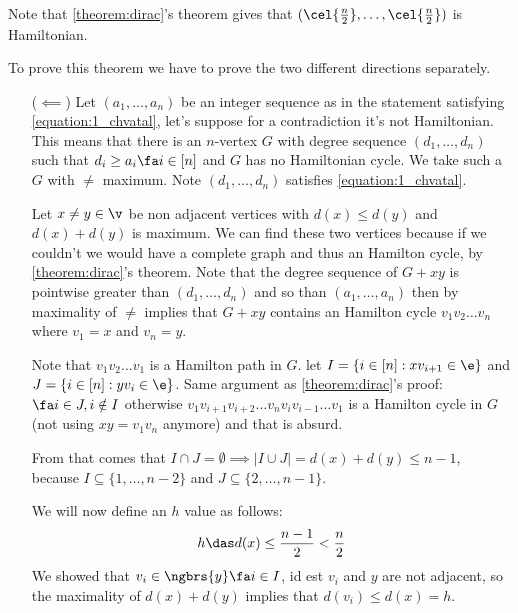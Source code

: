 Note that \ref{theorem:dirac}'s theorem gives that $(\cel{\frac{n}{2}}, \dots, \cel{\frac{n}{2}})$ is Hamiltonian.
\begin{prf}
    To prove this theorem we have to prove the two different directions separately.
    \begin{itemize}
        \item[($\impliedby$)] Let $(a_1, \dots, a_n)$ be an integer sequence as in the statement satisfying \ref{equation:1_chvatal}, let's suppose for a contradiction it's not Hamiltonian. This means that there is an $n$-vertex $G$ with degree sequence $(d_1, \dots, d_n)$ such that $d_i \geq a_i \fa i \in [n]$ and $G$ has no Hamiltonian cycle. We take such a $G$ with $\ne$ maximum. Note $(d_1, \dots, d_n)$ satisfies \ref{equation:1_chvatal}.
        
        Let $x \neq y \in \v$ be non adjacent vertices with $d(x) \leq d(y)$ and $d(x) + d(y)$ is maximum. We can find these two vertices because if we couldn't we would have a complete graph and thus an Hamilton cycle, by \ref{theorem:dirac}'s theorem. Note that the degree sequence of $G + xy$ is pointwise greater than $(d_1, \dots, d_n)$ and so than $(a_1, \dots, a_n)$ then by maximality of $\ne$ implies that $G + xy$ contains an Hamilton cycle $v_1v_2 \dots v_n$ where $v_1 = x$ and $v_n = y$.

        Note that $v_1v_2 \dots v_1$  is a Hamilton path in $G$. let $I = \{i \in [n]: xv_{i + 1} \in \e\}$ and $J = \{i \in [n]: yv_i \in \e\}$. Same argument as \ref{theorem:dirac}'s proof: $\fa i \in J, i \notin I$ otherwise $v_1 v_{i + 1} v_{i + 2} \dots v_n v_i v_{i - 1} \dots v_1$ is a Hamilton cycle in $G$ (not using $xy = v_1v_n$ anymore) and that is absurd.

        From that comes that $I \cap J = \emptyset \implies |I \cup J| = d(x) + d(y) \leq n - 1$, because $I \subseteq \{1, \dots, n - 2\}$ and $J \subseteq \{2, \dots, n - 1\}$.

        We will now define an $h$ value as follows:
        \begin{equation*}
            h \das d(x) \leq \frac{n - 1}{2} < \frac{n}{2}
        \end{equation*}
        We showed that $v_i \in \ngbrs{y} \fa i \in I$, id est $v_i$ and $y$ are not adjacent, so the maximality of $d(x) + d(y)$ implies that $d(v_i) \leq d(x) = h$.


\end{itemize}
\end{prf}
